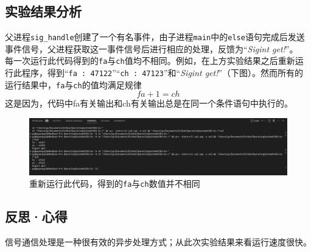 \documentclass[UTF8]{ctexart}
\begin{document}
\subsection{实验结果分析}
父进程\texttt{sig\_handle}创建了一个有名事件，由子进程\texttt{main}中的\texttt{else}语句完成后发送事件信号，父进程获取这一事件信号后进行相应的处理，反馈为“\textit{Sigint get!}”。\\
每一次运行此代码得到的\texttt{fa}与\texttt{ch}值均不相同。例如，在上方实验结果之后重新运行此程序，得到“\texttt{fa : 47122}”“\texttt{ch : 47123}”和“\textit{Sigint get!}”（下图）。然而所有的运行结果中，\texttt{fa}与\texttt{ch}的值均满足规律
\begin{equation}
	fa + 1 = ch
\end{equation}
这是因为，代码中fa有关输出和ch有关输出总是在同一个条件语句中执行的。
\begin{figure}[htbp]
	\begin{center}
		\includegraphics[width=0.8\pdfpagewidth]{os3-2.png}
	\end{center}
	\caption{重新运行此代码，得到的\texttt{fa}与\texttt{ch}数值并不相同}
\end{figure}
\subsection{反思·心得}
信号通信处理是一种很有效的异步处理方式；从此次实验结果来看运行速度很快。
\end{document}
